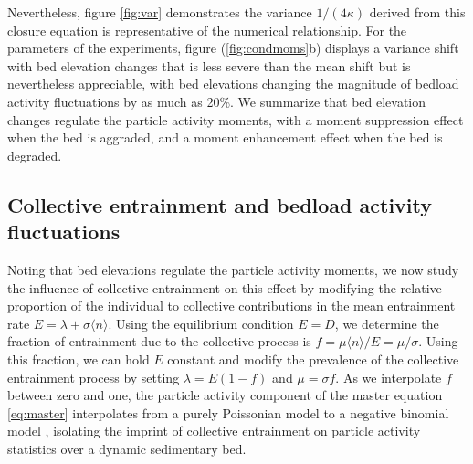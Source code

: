 Nevertheless, figure \ref{fig:var} demonstrates the variance $1/(4\kappa)$ derived from this closure equation is representative of the numerical relationship.
For the parameters of the \citet{Ancey2008} experiments, figure (\ref{fig:condmoms}b) displays a variance shift with bed elevation changes that is less severe than the mean shift but is nevertheless appreciable, with bed elevations changing the magnitude of bedload activity fluctuations by as much as 20\%.
We summarize that bed elevation changes regulate the particle activity moments, with a moment suppression effect when the bed is aggraded, and a moment enhancement effect when the bed is degraded.

\subsection{Collective entrainment and bedload activity fluctuations}
\label{sec:colent}
Noting that bed elevations regulate the particle activity moments, we now study the influence of collective entrainment on this effect by modifying the relative proportion of the individual to collective contributions in the mean entrainment rate $E=\lambda + \sigma \langle n \rangle $.
Using the equilibrium condition $E=D$, we determine the fraction of entrainment due to the collective process is $f = \mu\langle n \rangle/E = \mu/\sigma$. Using this fraction, we can hold $E$ constant and modify the prevalence of the collective entrainment process by setting $\lambda = E(1-f)$ and $\mu= \sigma f$. As we interpolate $f$ between zero and one, the particle activity component of the master equation \ref{eq:master} interpolates from a purely Poissonian model \citep{Ancey2006} to a negative binomial model \citep{Ancey2008}, isolating the imprint of collective entrainment on particle activity statistics over a dynamic sedimentary bed.

